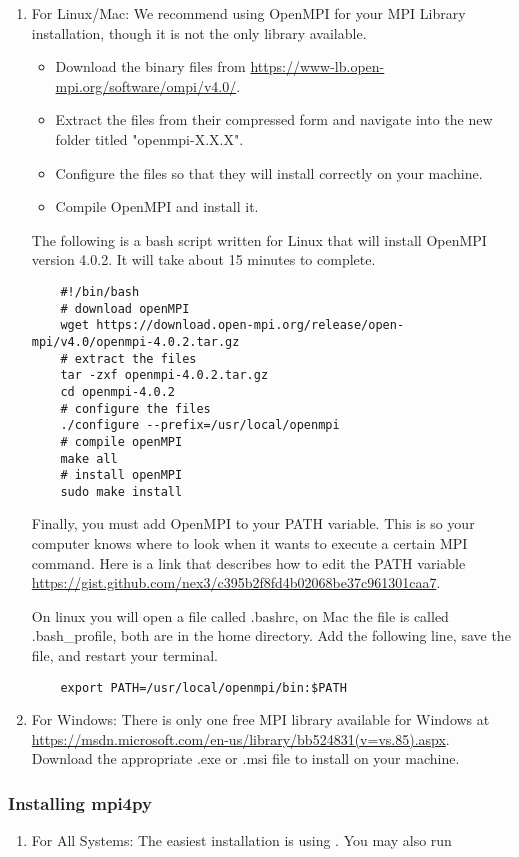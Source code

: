 \begin{enumerate}

\item For Linux/Mac:
We recommend using OpenMPI for your MPI Library installation, though it is not the only library available.
\begin{itemize}
    \item Download the binary files from \url{https://www-lb.open-mpi.org/software/ompi/v4.0/}.
    \item Extract the files from their compressed form and navigate into the new folder titled "openmpi-X.X.X".
    \item Configure the files so that they will install correctly on your machine.
    \item Compile OpenMPI and install it.
\end{itemize}

The following is a bash script written for Linux that will install OpenMPI version 4.0.2.
It will take about 15 minutes to complete.
\begin{lstlisting}
    #!/bin/bash
    # download openMPI
    wget https://download.open-mpi.org/release/open-mpi/v4.0/openmpi-4.0.2.tar.gz
    # extract the files
    tar -zxf openmpi-4.0.2.tar.gz
    cd openmpi-4.0.2
    # configure the files
    ./configure --prefix=/usr/local/openmpi
    # compile openMPI
    make all
    # install openMPI
    sudo make install
\end{lstlisting}

Finally, you must add OpenMPI to your PATH variable.
This is so your computer knows where to look when it wants to execute a certain MPI command.
Here is a link that describes how to edit the PATH variable \url{https://gist.github.com/nex3/c395b2f8fd4b02068be37c961301caa7}.

On linux you will open a file called .bashrc, on Mac the file is called .bash\_profile, both are in the home directory.
Add the following line, save the file, and restart your terminal.

\begin{lstlisting}
    export PATH=/usr/local/openmpi/bin:$PATH
\end{lstlisting}

\item For Windows:
There is only one free MPI library available for Windows at \url{https://msdn.microsoft.com/en-us/library/bb524831(v=vs.85).aspx}.
Download the appropriate .exe or .msi file to install on your machine.

\end{enumerate}


\subsubsection{Installing mpi4py}
\begin{enumerate}

\item For All Systems:
The easiest installation is using .
You may also run 

\end{enumerate}
